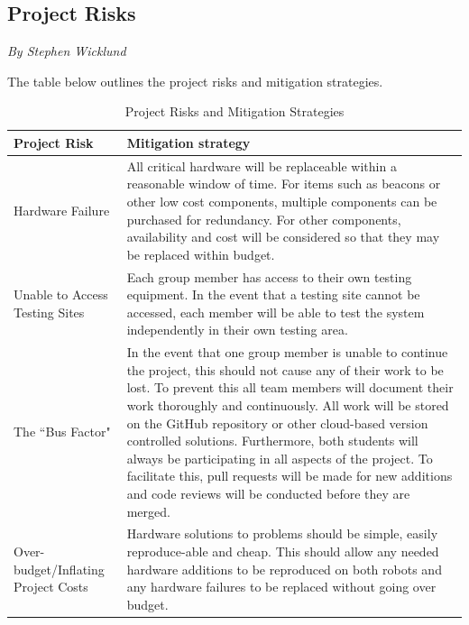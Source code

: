 \documentclass[12pt]{report}
\newcommand{\sectionAuthor}[1]{{\small\vspace{-1em}\textit{#1}}\bigskip\par}
\begin{document}
\subsection{Project Risks}
\sectionAuthor{By Stephen Wicklund}
The table below outlines the project risks and mitigation strategies.

\begin{table}[H]
\centering
    \caption{Project Risks and Mitigation Strategies}

    \begin{tabular}{  l  p{8cm}}
        \toprule
\textbf{Project Risk}      
& \textbf{Mitigation strategy} 
\\\hline
Hardware Failure 
& All critical hardware will be replaceable within a reasonable window of time. For items such as beacons or other low cost components, multiple components can be purchased for redundancy. For other components, availability and cost will be considered so that they may be replaced within budget. 
\\\hline
Unable to Access Testing Sites 
& Each group member has access to their own testing equipment. In the event that a testing site cannot be accessed, each member will be able to test the system independently in their own testing area.
\\\hline
The ``Bus Factor"   
& In the event that one group member is unable to continue the project, this should not cause any of their work to be lost. To prevent this all team members will document their work thoroughly and continuously. All work will be stored on the GitHub repository or other cloud-based version controlled solutions. Furthermore, both students will always be participating in all aspects of the project. To facilitate this, pull requests will be made for new additions and code reviews will be conducted before they are merged.
\\\hline
Over-budget/Inflating Project Costs
& Hardware solutions to problems should be simple, easily reproduce-able and cheap. This should allow any needed hardware additions to be reproduced on both robots and any hardware failures to be replaced without going over budget.
\\
        \bottomrule
    \end{tabular}
\end{table}


\end{document}
